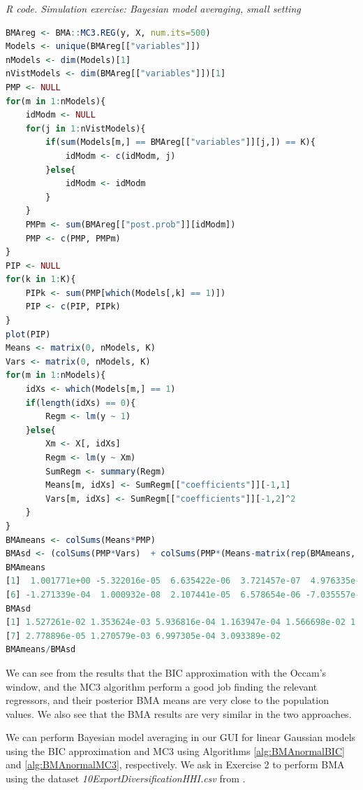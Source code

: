 \begin{tcolorbox}[enhanced,width=4.67in,center upper,
	fontupper=\large\bfseries,drop shadow southwest,sharp corners]
	\textit{R code. Simulation exercise: Bayesian model averaging, small setting}
	\begin{VF}
		\begin{lstlisting}[language=R]
BMAreg <- BMA::MC3.REG(y, X, num.its=500)
Models <- unique(BMAreg[["variables"]])
nModels <- dim(Models)[1]
nVistModels <- dim(BMAreg[["variables"]])[1]
PMP <- NULL
for(m in 1:nModels){
	idModm <- NULL
	for(j in 1:nVistModels){
		if(sum(Models[m,] == BMAreg[["variables"]][j,]) == K){
			idModm <- c(idModm, j)
		}else{
			idModm <- idModm
		} 
	}
	PMPm <- sum(BMAreg[["post.prob"]][idModm])
	PMP <- c(PMP, PMPm)
}
PIP <- NULL
for(k in 1:K){
	PIPk <- sum(PMP[which(Models[,k] == 1)])
	PIP <- c(PIP, PIPk)
}
plot(PIP)
Means <- matrix(0, nModels, K)
Vars <- matrix(0, nModels, K)
for(m in 1:nModels){
	idXs <- which(Models[m,] == 1)
	if(length(idXs) == 0){
		Regm <- lm(y ~ 1)
	}else{
		Xm <- X[, idXs]
		Regm <- lm(y ~ Xm)
		SumRegm <- summary(Regm)
		Means[m, idXs] <- SumRegm[["coefficients"]][-1,1]
		Vars[m, idXs] <- SumRegm[["coefficients"]][-1,2]^2 
	} 
}
BMAmeans <- colSums(Means*PMP)
BMAsd <- (colSums(PMP*Vars)  + colSums(PMP*(Means-matrix(rep(BMAmeans, each = nModels), nModels, K))^2))^0.5
BMAmeans
[1]  1.001771e+00 -5.322016e-05  6.635422e-06  3.721457e-07  4.976335e-01
[6] -1.271339e-04  1.000932e-08  2.107441e-05  6.578654e-06 -7.035557e-01 
BMAsd
[1] 1.527261e-02 1.353624e-03 5.936816e-04 1.163947e-04 1.566698e-02 1.987360e-03
[7] 2.778896e-05 1.270579e-03 6.997305e-04 3.093389e-02
BMAmeans/BMAsd
\end{lstlisting}
	\end{VF}
\end{tcolorbox}
We can see from the results that the BIC approximation with the Occam's window, and the MC3 algorithm perform a good job finding the relevant regressors, and their posterior BMA means are very close to the population values. We also see that the BMA results are very similar in the two approaches.

We can perform Bayesian model averaging in our GUI for linear Gaussian models using the BIC approximation and MC3 using Algorithms \ref{alg:BMAnormalBIC} and \ref{alg:BMAnormalMC3}, respectively. We ask in Exercise 2 to perform BMA using the dataset \textit{10ExportDiversificationHHI.csv} from \cite{Jetter2015}.  

